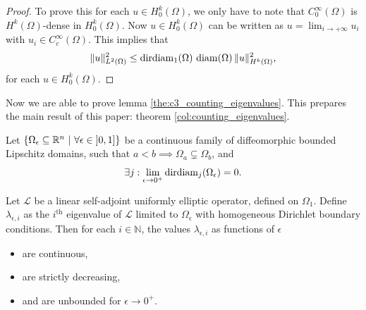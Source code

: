 \begin{proof}
  To prove this for each $u \in H_0^k(\Omega)$, we only have to note that
  $C^\infty_0(\Omega)$ is $H^k(\Omega)$-dense in $H^k_0(\Omega)$. Now $u \in H_0^k(\Omega)$ can be written as $u = \lim_{i \to +\infty} u_i$ with $u_i \in C^\infty_c(\Omega)$. This implies that
  $$\|u\|_{L^2(\Omega)}^2 \leq \operatorname{dirdiam}_1(\Omega) \, \operatorname{diam}(\Omega) \, \| u \|^2_{H^k(\Omega)}\text{,}$$
  for each $u \in H_0^k(\Omega)$.
\end{proof}

Now we are able to prove lemma \ref{the:c3_counting_eigenvalues}. This prepares the main result of this paper: theorem \ref{col:counting_eigenvalues}.

\begin{lemma}\label{the:c3_counting_eigenvalues}
  Let $\left\{\Omega_\epsilon \subseteq \RR^n \ | \ \forall \epsilon \in \left]0, 1\right]\right\}$ be a continuous family of diffeomorphic bounded Lipschitz domains, such that $ a < b \implies \Omega_a \subsetneq \Omega_b $, and
  $$
    \exists j : \lim_{\epsilon \to 0^{+}} \operatorname{dirdiam}_j(\Omega_\epsilon) = 0\text{.}
  $$

  Let $\mathcal{L}$ be a linear self-adjoint uniformly elliptic operator, defined on $\Omega_1$. Define $\lambda_{\epsilon,i}$ as the $i^\text{th}$ eigenvalue of $\mathcal{L}$ limited to $\Omega_\epsilon$ with homogeneous Dirichlet boundary conditions. Then for each $i \in \mathbb{N}$, the values $\lambda_{\epsilon,i}$ as functions of $\epsilon$
  \begin{itemize}
    \item are continuous,
    \item are strictly decreasing,
    \item and are unbounded for $\epsilon \to 0^{+}$.
  \end{itemize}
\end{lemma}
